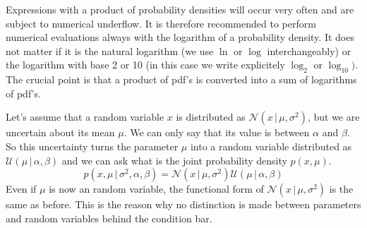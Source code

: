 \documentclass{tstextbook}
\begin{document}
\begin{remark}
Expressions with a product of probability densities will occur very often and are subject to numerical underflow. It is therefore recommended to perform numerical evaluations always with the logarithm of a probability density. It does not matter if it is the natural logarithm (we use $\ln$ or $\log$ interchangeably) or the logarithm with base 2 or 10 (in this case we write explicitely $\log_2$ or $\log_{10})$. The crucial point is that a product of pdf's is converted into a sum of logarithms of pdf's.
\end{remark}

\begin{example}
Let's assume that a random variable $x$ is distributed as $\mathcal{N}\left(x\,\vert\,\mu,\sigma^2\right)$, but we are uncertain about its mean $\mu$. We can only say that its value is between $\alpha$ and $\beta$. So this uncertainty turns the parameter $\mu$ into a random variable distributed as $\mathcal{U}\left(\mu\,\vert\,\alpha,\beta\right)$ and we can ask what is the joint probability density $p(x,\mu)$. 
  \begin{equation}
  p\left(x,\mu\,\vert\,\sigma^2,\alpha,\beta\right)=\mathcal{N}\left(x\,\vert\,\mu,\sigma^2\right)\mathcal{U}\left(\mu\,\vert\,\alpha,\beta\right)
  \end{equation}
Even if $\mu$ is now an random variable, the functional form of $\mathcal{N}\left(x\,\vert\,\mu,\sigma^2\right)$ is the same as before. This is the reason why no distinction is made between parameters and random variables behind the condition bar.
\end{example}
\end{document}
